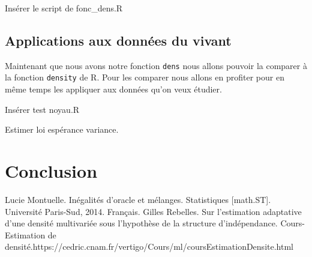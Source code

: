\documentclass[
]{book}
\theoremstyle{definition}
\theoremstyle{definition}
\theoremstyle{definition}
\theoremstyle{definition}
\theoremstyle{remark}
\begin{document}
Insérer le script de fonc\_dens.R

\hypertarget{applications-aux-donnuxe9es-du-vivant}{%
\section{Applications aux données du vivant}\label{applications-aux-donnuxe9es-du-vivant}}

Maintenant que nous avons notre fonction \texttt{dens} nous allons pouvoir la comparer à la fonction \texttt{density} de R. Pour les comparer nous allons en profiter pour en même temps les appliquer aux données qu'on veux étudier.

Insérer test noyau.R

Estimer loi espérance variance.

\hypertarget{conclusion}{%
\chapter{Conclusion}\label{conclusion}}

\label{eq:oracle} Lucie Montuelle. Inégalités d'oracle et mélanges. Statistiques {[}math.ST{]}. Université Paris-Sud, 2014.
Français.\newline
\label{eq:est-ad} Gilles Rebelles. Sur l'estimation adaptative d'une densité multivariée sous l'hypothèse de la structure d'indépendance.\newline
\label{eq:cours-est} Cours-Estimation de densité.https://cedric.cnam.fr/vertigo/Cours/ml/coursEstimationDensite.html\newline

  
\end{document}
